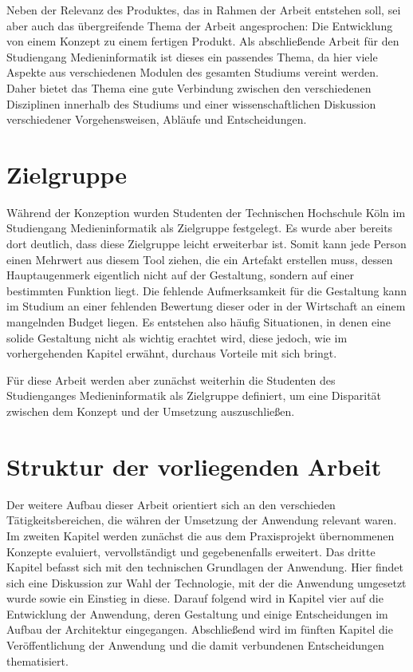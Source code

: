 Neben der Relevanz des Produktes, das in Rahmen der Arbeit entstehen soll, sei aber auch das übergreifende Thema der Arbeit angesprochen: Die Entwicklung von einem Konzept zu einem fertigen Produkt.
Als abschließende Arbeit für den Studiengang Medieninformatik ist dieses ein passendes Thema, da hier viele Aspekte aus verschiedenen Modulen des gesamten Studiums vereint werden. Daher bietet das Thema eine gute Verbindung zwischen den verschiedenen Disziplinen innerhalb des Studiums und einer wissenschaftlichen Diskussion verschiedener Vorgehensweisen, Abläufe und Entscheidungen.


\section{Zielgruppe}
Während der Konzeption wurden Studenten der Technischen Hochschule Köln im Studiengang Medieninformatik als Zielgruppe festgelegt. Es wurde aber bereits dort deutlich, dass diese Zielgruppe leicht erweiterbar ist. Somit kann jede Person einen Mehrwert aus diesem Tool ziehen, die ein Artefakt erstellen muss, dessen Hauptaugenmerk eigentlich nicht auf der Gestaltung, sondern auf einer bestimmten Funktion liegt. Die fehlende Aufmerksamkeit für die Gestaltung kann im Studium an einer fehlenden Bewertung dieser oder in der Wirtschaft an einem mangelnden Budget liegen. Es entstehen also häufig Situationen, in denen eine solide Gestaltung nicht als wichtig erachtet wird, diese jedoch, wie im vorhergehenden Kapitel erwähnt, durchaus Vorteile mit sich bringt.

Für diese Arbeit werden aber zunächst weiterhin die Studenten des Studienganges Medieninformatik als Zielgruppe definiert, um eine Disparität zwischen dem Konzept und der Umsetzung auszuschließen.

\section{Struktur der vorliegenden Arbeit}
Der weitere Aufbau dieser Arbeit orientiert sich an den verschieden Tätigkeitsbereichen, die währen der Umsetzung der Anwendung relevant waren.\\
Im zweiten Kapitel werden zunächst die aus dem Praxisprojekt übernommenen Konzepte evaluiert, vervollständigt und  gegebenenfalls erweitert.
Das dritte Kapitel befasst sich mit den technischen Grundlagen der Anwendung. Hier findet sich eine Diskussion zur Wahl der Technologie, mit der die Anwendung umgesetzt wurde sowie ein Einstieg in diese.
Darauf folgend wird in Kapitel vier auf die Entwicklung der Anwendung, deren Gestaltung und einige Entscheidungen im Aufbau der Architektur eingegangen.
Abschließend wird im fünften Kapitel die Veröffentlichung der Anwendung und die damit verbundenen Entscheidungen thematisiert.
